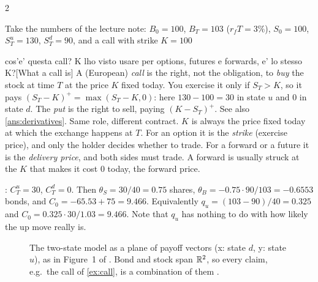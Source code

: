 \begin{paracol}{2}
\begin{example}\label{ex:call}
Take the numbers of the lecture note: $B_0=100$, $B_T=103$ ($r_fT=3\%$), $S_0=100$, $S_T^u=130$,
$S_T^d=90$, and a call with strike $K=100$\begin{answer}{cos'e' questa call? K lho visto usare per options, futures e forwards, e' lo stesso K?}[What a call is]
A (European) \emph{call} is the right, not the obligation, to \emph{buy} the stock at time $T$ at the
price $K$ fixed today. You exercise it only if $S_T>K$, so it pays $(S_T-K)^+=\max(S_T-K,0)$: here $130-100=30$ in state $u$
and $0$ in state $d$. The \emph{put} is the right to sell, paying $(K-S_T)^+$. See also \cref{ans:derivatives}.
Same role, different contract. $K$ is always the price fixed today at which the exchange happens at $T$.
For an option it is the \emph{strike} (exercise price), and only the holder decides whether to trade. For
a forward or a future it is the \emph{delivery price}, and both sides must trade. A forward is usually
struck at the $K$ that makes it cost $0$ today, the forward price.
\end{answer}: $C_T^u=30$, $C_T^d=0$. Then
$\theta_S = 30/40 = 0.75$ shares, $\theta_B = -0.75\cdot 90/103 = -0.6553$ bonds, and
$C_0 = -65.53+75 = 9.466$. Equivalently $q_u = (103-90)/40 = 0.325$ and
$C_0 = 0.325\cdot 30/1.03 = 9.466$. Note that $q_u$ has nothing to do with how likely the up move
really is.
\end{example}

\begin{figure}[ht]
\centering
{}
\caption{The two-state model as a plane of payoff vectors (x: state $d$, y: state $u$), as in
Figure~1 of . Bond and stock span $\mathbb{R}^2$, so every claim, e.g.\ the call of
\cref{ex:call}, is a combination of them .}\label{fig:payoffplane}
\end{figure}


\end{paracol}

